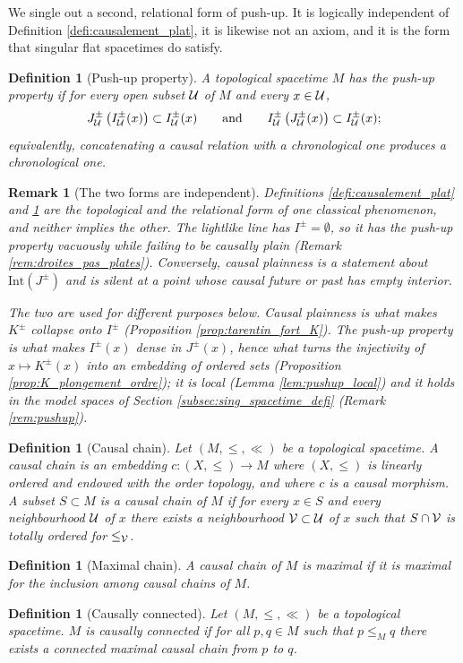 \documentclass[a4paper,twoside]{article}
\newtheorem{defi}[lem]{Definition}
\newtheorem{rem}[lem]{Remark}
\begin{document}
We single out a second, relational form of push-up. It is logically independent of Definition
\ref{defi:causalement_plat}, it is likewise not an axiom, and it is the form that singular flat
spacetimes do satisfy.

\begin{defi}[Push-up property]\label{defi:pushup}
A topological spacetime $M$ has the \emph{push-up property} if for every open subset $\mathcal{U}$ of $M$ and
every $x\in \mathcal{U}$,
$$J^\pm_{\mathcal{U}}\left(I^\pm_{\mathcal{U}}(x)\right)\subset I^\pm_{\mathcal{U}}(x) \qquad\text{and}\qquad I^\pm_{\mathcal{U}}\left(J^\pm_{\mathcal{U}}(x)\right)\subset I^\pm_{\mathcal{U}}(x);$$
equivalently, concatenating a causal relation with a chronological one produces a chronological one.
\end{defi}

\begin{rem}[The two forms are independent]\label{rem:deux_pushup}
Definitions \ref{defi:causalement_plat} and \ref{defi:pushup} are the topological and the relational
form of one classical phenomenon, and neither implies the other. The lightlike line has
$I^\pm=\emptyset$, so it has the push-up property vacuously while failing to be causally plain
(Remark \ref{rem:droites_pas_plates}). Conversely, causal plainness is a statement about
$\mathrm{Int}\left(J^\pm\right)$ and is silent at a point whose causal future or past has empty
interior.

The two are used for different purposes below. Causal plainness is what makes $K^\pm$ collapse onto
$I^\pm$ (Proposition \ref{prop:tarentin_fort_K}). The push-up property is what makes $I^\pm(x)$
\emph{dense} in $J^\pm(x)$, hence what turns the injectivity of $x\mapsto K^\pm(x)$ into an embedding
of ordered sets (Proposition \ref{prop:K_plongement_ordre}); it is local (Lemma
\ref{lem:pushup_local}) and it holds in the model spaces of Section \ref{subsec:sing_spacetime_defi}
(Remark \ref{rem:pushup}).
\end{rem}
\begin{defi}[Causal chain]\label{def:causal_chain}
Let $(M,\leq,\ll)$ be a topological spacetime.
A causal chain is an embedding $c:(X,\leq) \rightarrow M$ where $(X,\leq)$ is linearly ordered and endowed with the order topology, and where $c$ is a causal morphism.
A subset $S\subset M$ is a causal chain of $M$ if for every $x\in S$ and every neighbourhood $\mathcal{U}$ of $x$ there exists a neighbourhood $\mathcal V\subset \mathcal{U}$ of $x$ such that $S\cap \mathcal V$ is totally ordered for $\leq_\mathcal V$.
\end{defi}
\begin{defi}[Maximal chain]\label{def:maximal_chain}
A causal chain of $M$ is maximal if it is maximal for the inclusion among causal chains of $M$.
\end{defi}
\begin{defi}[Causally connected]\label{def:causally_connected}
Let $(M,\leq,\ll)$ be a topological spacetime.
$M$ is causally connected if for all $p,q\in M$ such that $p\leq_M q$ there exists a connected maximal causal chain from $p$ to $q$.
\end{defi}
\end{document}
